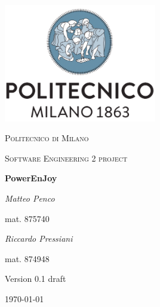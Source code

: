 \documentclass{report}
\begin{document}
\begin{titlepage}
	\centering
	\includegraphics[width=0.5\textwidth]{polimi-logo}\par\vspace{1cm}
	{\scshape\LARGE Politecnico di Milano\par}
	\vspace{1cm}
	{\scshape\Large Software Engineering 2 project\par}
	\vspace{1.5cm}
	{\huge\bfseries PowerEnJoy\par}
	\vspace{2cm}
	\begin{multicols}{2}
		{\Large\itshape Matteo Penco\par}
		\vspace{0.25cm}
		mat. 875740
		\vfill\columnbreak
		{\Large\itshape Riccardo Pressiani\par}
		\vspace{0.25cm}
		mat. 874948
	\end{multicols}
	
	\vfill
	
	{\Large Version 0.1 draft\par}
	\vspace{1.25cm}
	{\large \today\par}
\end{titlepage}

\begin{versionhistory}
\end{versionhistory}

\tableofcontents





\begin{appendices}
	
	
\end{appendices}

\listoffigures
\begingroup
\let\clearpage\relax
\listoftables
\endgroup



\end{document}

